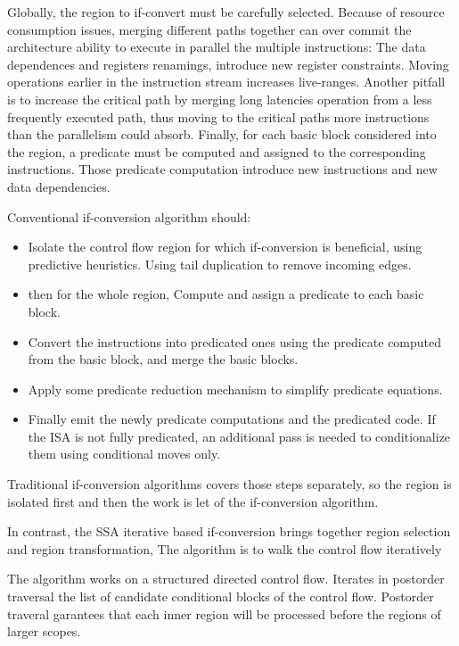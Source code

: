 Globally, the region to if-convert must be carefully selected. Because of resource consumption issues, merging different paths together can over commit the architecture ability to execute in parallel the multiple instructions: The data dependences and registers renamings, introduce new register constraints. Moving operations earlier in the instruction stream increases live-ranges. 
Another pitfall is to increase the critical path by merging long latencies operation from a less frequently executed path, thus moving to the critical paths more instructions than the parallelism could absorb.
Finally, for each basic block considered into the region, a predicate must be computed and assigned to the corresponding instructions. Those predicate computation introduce new instructions and new data dependencies.

Conventional if-conversion algorithm should:

\begin{itemize}
\item Isolate the control flow region for which if-conversion is beneficial, using predictive heuristics. Using tail duplication to remove incoming edges. 
\item then for the whole region, Compute and assign a predicate to each basic block.
\item Convert the instructions into predicated ones using the predicate computed from the basic block, and merge the basic blocks.
\item Apply some predicate reduction mechanism to simplify predicate equations.
\item Finally emit the newly predicate computations and the predicated code. If the ISA is not fully predicated, an additional pass is needed to conditionalize them using conditional moves only.
\end{itemize}

Traditional if-conversion algorithms \cite{Schlansker-predicated} covers those steps separately, so the region is isolated first and then the work is let of the if-conversion algorithm.

In contrast, the SSA iterative based if-conversion  brings together region selection and region transformation, The algorithm is to walk the control flow iteratively 

The algorithm works on a structured directed control flow. Iterates in postorder traversal the list of candidate conditional blocks of the control flow. Postorder traveral garantees that each inner region will be processed before the regions of larger scopes.


